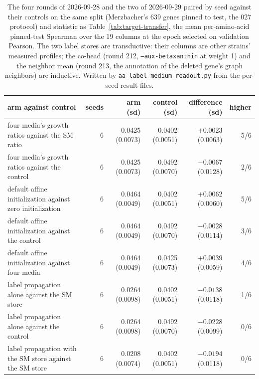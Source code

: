 \begin{table}[H]
  \centering
  \footnotesize
  \setlength{\tabcolsep}{3pt}
  \caption[Rounds 208 to 213: the medium controls, the label stores, the reverse co-head and the neighbor mean, paired]{The four rounds of 2026-09-28 and the two of 2026-09-29 paired by seed against their controls on the same split (Merzbacher's 639 genes pinned to test, the 027 protocol) and statistic as Table~\ref{tab:target-transfer}, the mean per-amino-acid pinned-test Spearman over the 19 columns at the epoch selected on validation Pearson. The two label stores are transductive: their columns are other strains' measured profiles; the co-head (round 212, \texttt{--aux-betaxanthin} at weight 1) and the neighbor mean (round 213, the annotation of the deleted gene's graph neighbors) are inductive. Written by \texttt{aa\_label\_medium\_readout.py} from the per-seed result files.}
  \label{tab:aa-label-medium}
  \begin{tabular}{@{}lrrrrr@{}}
    \hline
    arm against control & seeds & arm (sd) & control (sd) & difference (sd) & higher \\
    \hline
    four media's growth ratios against the SM ratio & 6 & 0.0425 (0.0073) & 0.0402 (0.0051) & $+0.0023$ (0.0063) & 5/6 \\
    four media's growth ratios against the control & 6 & 0.0425 (0.0073) & 0.0492 (0.0070) & $-0.0067$ (0.0128) & 2/6 \\
    default affine initialization against zero initialization & 6 & 0.0464 (0.0049) & 0.0402 (0.0051) & $+0.0062$ (0.0060) & 5/6 \\
    default affine initialization against the control & 6 & 0.0464 (0.0049) & 0.0492 (0.0070) & $-0.0028$ (0.0114) & 3/6 \\
    default affine initialization against four media & 6 & 0.0464 (0.0049) & 0.0425 (0.0073) & $+0.0039$ (0.0059) & 4/6 \\
    label propagation alone against the SM store & 6 & 0.0264 (0.0098) & 0.0402 (0.0051) & $-0.0138$ (0.0118) & 1/6 \\
    label propagation alone against the control & 6 & 0.0264 (0.0098) & 0.0492 (0.0070) & $-0.0228$ (0.0099) & 0/6 \\
    label propagation with the SM store against the SM store & 6 & 0.0208 (0.0074) & 0.0402 (0.0051) & $-0.0194$ (0.0118) & 0/6 \\

\end{tabular}
\end{table}
